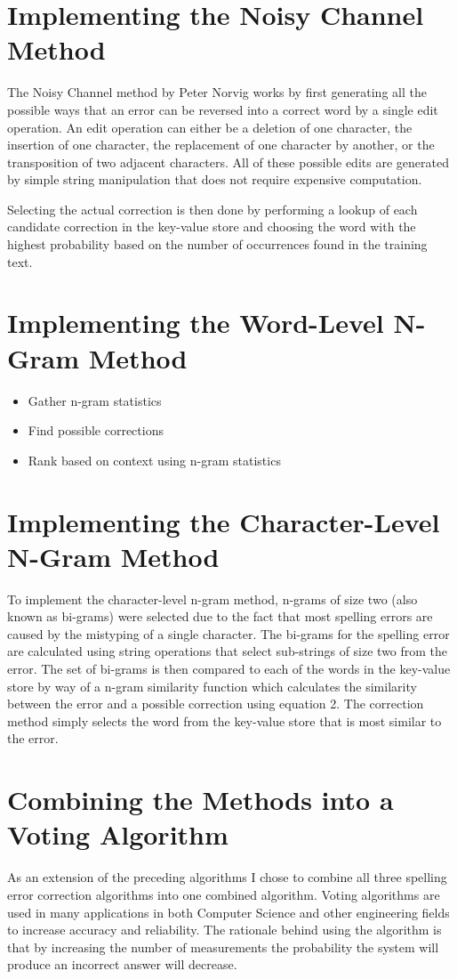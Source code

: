 \section{Implementing the Noisy Channel Method}
The Noisy Channel method by Peter Norvig works by first generating all the possible ways that an error can be reversed into a correct word by a single edit operation. An edit operation can either be a deletion of one character, the insertion of one character, the replacement of one character by another, or the transposition of two adjacent characters. All of these possible edits are generated by simple string manipulation that does not require expensive computation.

Selecting the actual correction is then done by performing a lookup of each candidate correction in the key-value store and choosing the word with the highest probability based on the number of occurrences found in the training text.

\section{Implementing the Word-Level N-Gram Method}
\begin{itemize}
	\item Gather n-gram statistics
	\item Find possible corrections
	\item Rank based on context using n-gram statistics
\end{itemize}

\section{Implementing the Character-Level N-Gram Method}
To implement the character-level n-gram method, n-grams of size two (also known as bi-grams) were selected due to the fact that most spelling errors are caused by the mistyping of a single character. The bi-grams for the spelling error are calculated using string operations that select sub-strings of size two from the error. The set of bi-grams is then compared to each of the words in the key-value store by way of a n-gram similarity function which calculates the similarity between the error and a possible correction using equation 2. The correction method simply selects the word from the key-value store that is most similar to the error.

\section{Combining the Methods into a Voting Algorithm}
As an extension of the preceding algorithms I chose to combine all three spelling error correction algorithms into one combined algorithm. Voting algorithms are used in many applications in both Computer Science and other engineering fields to increase accuracy and reliability. The rationale behind using the algorithm is that by increasing the number of measurements the probability the system will produce an incorrect answer will decrease.

